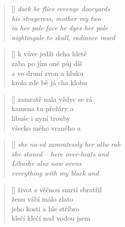 \documentclass[a4]{article}
\begin{document}
\settowidth{\versewidth}{Than Tycho Brahe, or Erra Pater:}
\begin{verse}[\versewidth]
\it
dark he flies revenge dooryards \\
his strayeress, mother my two\\
in her pale face he dyes her pale\\
nightingale to skull, radiance rosed\\
\end{verse}

\settowidth{\versewidth}{Than Tycho Brahe, or Erra Pater:}
\begin{verse}[\versewidth]
k vůve jedži  deha  hletě \\
zaba  po jím  oné půj díš \\
a vo druní  zvon  a  hluku \\
krola  zde bě  já cha klobu\\
\end{verse}

\settowidth{\versewidth}{Than Tycho Brahe, or Erra Pater:}
\begin{verse}[\versewidth]
zamratě  nala  vždyc se  rá\\
kamena  tu  přežáry  a \\
libuše  i  nyní  trouby \\
všecko  mého  vraného  a \\
\end{verse}

\settowidth{\versewidth}{Than Tycho Brahe, or Erra Pater:}
\begin{verse}[\versewidth]
\it
she na-ed zamratessly her allw rah\\
she stoned -- here over-heats and\\
Libushe also now ovens\\
everything with my black and\\
\end{verse}

\settowidth{\versewidth}{Than Tycho Brahe, or Erra Pater:}
\begin{verse}[\versewidth]
život  s věčnou  smrtí  sbratřil \\
ženu  vábí  málo  zlato \\
jeho  kosti  a  hle  stříbro \\
klečí  klečí  nad  vodou  jsem\\
\end{verse}
\end{document}
